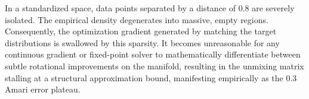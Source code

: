 \documentclass[12pt,a4paper,twoside,openany]{book}
\begin{document}
In a standardized space, data points separated by a distance of $0.8$ are severely isolated. The empirical density degenerates into massive, empty regions. 
Consequently, the optimization gradient generated by matching the target distributions is swallowed by this sparsity. It becomes unreasonable for 
any continuous gradient or fixed-point solver to mathematically differentiate between subtle rotational improvements on the manifold, 
resulting in the unmixing matrix stalling at a structural approximation bound, manifesting empirically as the $0.3$ Amari error plateau.
\backmatter


 
\end{document}
